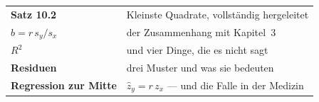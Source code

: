 \begin{merksatz}
\begin{center}
\renewcommand{\arraystretch}{1.5}
\begin{tabular}{@{}P{3.0cm}P{5.6cm}@{}}
\toprule
\textbf{Satz 10.2} & Kleinste Quadrate, vollständig hergeleitet\\
\textbf{$b = r\,s_y/s_x$} & der Zusammenhang mit Kapitel~3\\
\textbf{$R^2$} & und vier Dinge, die es nicht sagt\\
\textbf{Residuen} & drei Muster und was sie bedeuten\\
\textbf{Regression zur Mitte} & $\hat z_y = r\,z_x$ --- und die Falle in der Medizin\\
\bottomrule
\end{tabular}
\end{center}

\begin{center}
\begin{minipage}{0.88\textwidth}
\end{minipage}
\end{center}
\end{merksatz}
